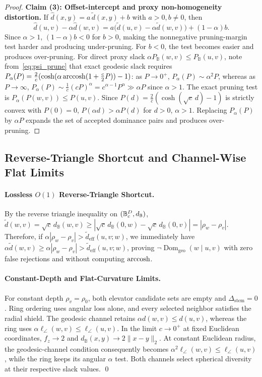 \begin{proof}
\textbf{Claim (3): Offset-intercept and proxy non-homogeneity distortion.}
If $\hat{d}(x, y) = a\,\tilde{d}(x, y) + b$ with $a > 0, b \ne 0$, then
\begin{equation}
  \hat{d}(u, v) - \alpha\hat{d}(w, v) = a\bigl(\tilde{d}(u, v) - \alpha\tilde{d}(w, v)\bigr) + (1 - \alpha)b.
\end{equation}
Since $\alpha > 1$, $(1-\alpha)b<0$ for $b>0$, making the nonnegative pruning-margin test harder and producing under-pruning. For $b<0$, the test becomes easier and produces over-pruning.
For direct proxy slack $\alpha P_{\mathbb{B}}(w, v) \le P_{\mathbb{B}}(u, v)$, note from~\eqref{eq:psi_prune} that exact geodesic slack requires $P_\alpha(P) = \frac{2}{c}(\cosh(\alpha\operatorname{arccosh}(1 + \frac{c}{2}P)) - 1)$: as $P \to 0^+$, $P_\alpha(P) \sim \alpha^2 P$, whereas as $P \to \infty$, $P_\alpha(P) \sim \frac{1}{c}(c P)^\alpha = c^{\alpha - 1} P^\alpha \gg \alpha P$ since $\alpha > 1$.
The exact pruning test is $P_\alpha(P(w,v))\le P(u,v)$. Since $P(d)=\frac{2}{c}(\cosh(\sqrt c\,d)-1)$ is strictly convex with $P(0)=0$, $P(\alpha d)>\alpha P(d)$ for $d>0$, $\alpha>1$. Replacing $P_\alpha(P)$ by $\alpha P$ expands the set of accepted dominance pairs and produces over-pruning.
\end{proof}

\subsection{Reverse-Triangle Shortcut and Channel-Wise Flat Limits}
\paragraph{Lossless $O(1)$ Reverse-Triangle Shortcut.}
By the reverse triangle inequality on $(\mathbb{B}_c^D, d_{\mathbb{B}})$, $\tilde{d}(w, v) = \sqrt{c}\,d_{\mathbb{B}}(w, v) \ge |\sqrt{c}\,d_{\mathbb{B}}(0, w) - \sqrt{c}\,d_{\mathbb{B}}(0, v)| = |\rho_w - \rho_v|$.
Therefore, if $\alpha|\rho_w - \rho_v| > \tilde{d}_{\mathrm{eff}}(u, v; w)$, we immediately have $\alpha\tilde{d}(w, v) \ge \alpha|\rho_w - \rho_v| > \tilde{d}_{\mathrm{eff}}(u, v; w)$, proving $\neg\operatorname{Dom}_{\mathrm{geo}}(w \mid u, v)$ with zero false rejections and without computing $\operatorname{arccosh}$.

\paragraph{Constant-Depth and Flat-Curvature Limits.}
For constant depth $\rho_v=\rho_0$, both elevator candidate sets are empty and $\Delta_{\mathrm{stem}}=0$. Ring ordering uses angular loss alone, and every selected neighbor satisfies the radial shield. The geodesic channel retains $\alpha d(w,v)\le d(u,v)$, whereas the ring uses $\alpha\ell_\angle(w,v)\le\ell_\angle(u,v)$. In the limit $c\to0^+$ at fixed Euclidean coordinates, $f_z\to2$ and $d_{\mathbb B}(x,y)\to2\|x-y\|_2$. At constant Euclidean radius, the geodesic-channel condition consequently becomes $\alpha^2\ell_\angle(w,v)\le\ell_\angle(u,v)$, while the ring keeps its angular $\alpha$ test. Both channels select spherical diversity at their respective slack values. \qed

